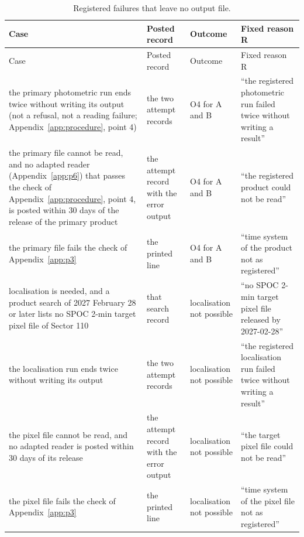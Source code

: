 \begin{longtable}{>{\raggedright\arraybackslash}p{}>{\raggedright\arraybackslash}p{}>{\raggedright\arraybackslash}p{}>{\raggedright\arraybackslash}p{}}
\caption{Registered failures that leave no output file.\label{tab:failures}}\\
\toprule
Case & Posted record & Outcome & Fixed reason R \\
\midrule
\endfirsthead
\toprule
Case & Posted record & Outcome & Fixed reason R \\
\midrule
\endhead
the primary photometric run ends twice without writing its output (not a refusal, not a reading failure;
  Appendix~\ref{app:procedure}, point 4) & the two attempt records & O4 for A and B & ``the registered photometric run
  failed twice without writing a result'' \\
the primary file cannot be read, and no adapted reader (Appendix~\ref{app:p6}) that passes the check of
  Appendix~\ref{app:procedure}, point 4, is posted within 30 days of the release of the primary product & the attempt
  record with the error output & O4 for A and B & ``the registered product could not be read'' \\
the primary file fails the check of Appendix~\ref{app:p3} & the printed line & O4 for A and B & ``time system of the
  product not as registered'' \\
localisation is needed, and a product search of 2027 February 28 or later lists no SPOC 2-min target pixel file of
  Sector 110 & that search record & localisation not possible & ``no SPOC 2-min target pixel file released by
  2027-02-28'' \\
the localisation run ends twice without writing its output & the two attempt records & localisation not possible &
  ``the registered localisation run failed twice without writing a result'' \\
the pixel file cannot be read, and no adapted reader is posted within 30 days of its release & the attempt record
  with the error output & localisation not possible & ``the target pixel file could not be read'' \\
the pixel file fails the check of Appendix~\ref{app:p3} & the printed line & localisation not possible & ``time system
  of the pixel file not as registered'' \\
\bottomrule
\end{longtable}

